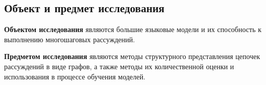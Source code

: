 \subsection{Объект и предмет исследования}
\label{subsec:object-subject}

\textbf{Объектом исследования} являются большие языковые модели и их способность к выполнению многошаговых рассуждений.

\textbf{Предметом исследования} являются методы структурного представления цепочек рассуждений в виде графов, а также методы их количественной оценки и использования в процессе обучения моделей.





